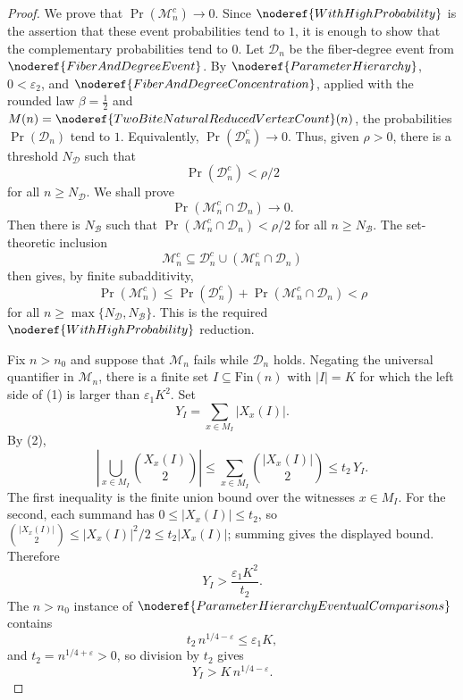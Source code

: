 \begin{proof}
We prove that \(\Pr(\mathcal M_n^c)\to0\).  Since
\(\noderef{WithHighProbability}\) is the assertion that these event
probabilities tend to \(1\), it is enough to show that the complementary
probabilities tend to \(0\).  Let \(\mathcal D_n\) be the fiber-degree event
from \(\noderef{FiberAndDegreeEvent}\).  By
\(\noderef{ParameterHierarchy}\), \(0<\varepsilon_2\), and
\(\noderef{FiberAndDegreeConcentration}\), applied with the rounded law
\(\beta=\frac12\) and
\(M(n)=\noderef{TwoBiteNaturalReducedVertexCount}(n)\), the probabilities
\(\Pr(\mathcal D_n)\) tend to \(1\).  Equivalently,
\(\Pr(\mathcal D_n^c)\to0\).  Thus, given \(\rho>0\), there is a threshold
\(N_{\mathcal D}\) such that
\[
\Pr(\mathcal D_n^c)<\rho/2
\]
for all \(n\ge N_{\mathcal D}\).  We shall prove
\[
\Pr(\mathcal M_n^c\cap\mathcal D_n)\to0. \tag{3}
\]
Then there is \(N_{\mathcal B}\) such that
\(\Pr(\mathcal M_n^c\cap\mathcal D_n)<\rho/2\) for all
\(n\ge N_{\mathcal B}\).  The set-theoretic inclusion
\[
\mathcal M_n^c\subseteq
\mathcal D_n^c\cup(\mathcal M_n^c\cap\mathcal D_n)
\]
then gives, by finite subadditivity,
\[
\Pr(\mathcal M_n^c)
\le \Pr(\mathcal D_n^c)+\Pr(\mathcal M_n^c\cap\mathcal D_n)<\rho
\]
for all \(n\ge\max\{N_{\mathcal D},N_{\mathcal B}\}\).  This is the required
\(\noderef{WithHighProbability}\) reduction.

Fix \(n>n_0\) and suppose that \(\mathcal M_n\) fails while
\(\mathcal D_n\) holds.  Negating the universal quantifier in
\(\mathcal M_n\), there is a finite set \(I\subseteq\mathrm{Fin}(n)\) with
\(|I|=K\) for which the left side of (1) is larger than
\(\varepsilon_1K^2\).  Set
\[
Y_I=\sum_{x\in M_I}|X_x(I)|.
\]
By (2),
\[
\left|\bigcup_{x\in M_I}\binom{X_x(I)}2\right|
\le \sum_{x\in M_I}\binom{|X_x(I)|}{2}
\le t_2\,Y_I.
\]
The first inequality is the finite union bound over the witnesses \(x\in M_I\).
For the second, each summand has \(0\le |X_x(I)|\le t_2\), so
\(\binom{|X_x(I)|}{2}\le |X_x(I)|^2/2\le t_2|X_x(I)|\); summing gives the
displayed bound.
Therefore
\[
Y_I>\frac{\varepsilon_1K^2}{t_2}.
\]
The \(n>n_0\) instance of
\(\noderef{ParameterHierarchyEventualComparisons}\) contains
\[
t_2\,n^{1/4-\varepsilon}\le \varepsilon_1K,
\]
and \(t_2=n^{1/4+\varepsilon}>0\), so division by \(t_2\) gives
\[
Y_I>K\,n^{1/4-\varepsilon}. \tag{4}
\]


\end{proof}
